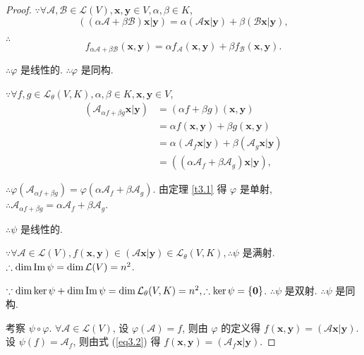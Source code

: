 \documentclass[color=black,device=normal,lang=cn,mode=geye]{elegantnote}
\begin{document}
\begin{proof}
    $\because\forall\mathcal{A},\mathcal{B}\in\mathcal{L}(V),\boldsymbol{x},\boldsymbol{y}\in V,\alpha,\beta\in K$,
    \[((\alpha\mathcal{A}+\beta\mathcal{B})\boldsymbol{x}|\boldsymbol{y})=\alpha(\mathcal{A}\boldsymbol{x}|\boldsymbol{y})+\beta(\mathcal{B}\boldsymbol{x}|\boldsymbol{y}),\]
    
    $\therefore$
    \[f_{\alpha\mathcal{A}+\beta\mathcal{B}}(\boldsymbol{x},\boldsymbol{y})=\alpha f_{\mathcal{A}}(\boldsymbol{x},\boldsymbol{y})+\beta f_{\mathcal{B}}(\boldsymbol{x},\boldsymbol{y}).\]

    $\therefore\varphi$ 是线性的. $\therefore\varphi$ 是同构.

    $\because\forall f,g\in\mathcal{L}_\theta(V,K),\alpha,\beta\in K,\boldsymbol{x},\boldsymbol{y}\in V$,
    \begin{align*}
        (\mathcal{A}_{\alpha f+\beta g}\boldsymbol{x}|\boldsymbol{y}) & =(\alpha f+\beta g)(\boldsymbol{x},\boldsymbol{y}) \\
        & =\alpha f(\boldsymbol{x},\boldsymbol{y})+\beta g(\boldsymbol{x},\boldsymbol{y}) \\
        & =\alpha(\mathcal{A}_f\boldsymbol{x}|\boldsymbol{y})+\beta(\mathcal{A}_g\boldsymbol{x}|\boldsymbol{y}) \\
        & =((\alpha\mathcal{A}_f+\beta\mathcal{A}_g)\boldsymbol{x}|\boldsymbol{y}),
    \end{align*}

    $\therefore\varphi(\mathcal{A}_{\alpha f+\beta g})=\varphi(\alpha\mathcal{A}_f+\beta\mathcal{A}_g)$. 由定理 \ref{t3.1} 得 $\varphi$ 是单射, $\therefore\mathcal{A}_{\alpha f+\beta g}=\alpha\mathcal{A}_f+\beta\mathcal{A}_g$.

    $\therefore\psi$ 是线性的.

    $\because\forall\mathcal{A}\in\mathcal{L}(V),f(\boldsymbol{x},\boldsymbol{y})\in(\mathcal{A}\boldsymbol{x}|\boldsymbol{y})\in\mathcal{L}_\theta(V,K),\therefore\psi$ 是满射. $\therefore\dim\operatorname{Im} \psi=\dim\mathcal{L}(V)=n^2$.

    $\because\dim\ker\psi+\dim\operatorname{Im} \psi=\dim\mathcal{L}_\theta(V,K)=n^2,\therefore\ker\psi=\{\boldsymbol{0}\}$. $\therefore\psi$ 是双射. $\therefore\psi$ 是同构.

    考察 $\psi\circ\varphi$. $\forall\mathcal{A}\in\mathcal{L}(V)$, 设 $\varphi(\mathcal{A})=f$, 则由 $\varphi$ 的定义得 $f(\boldsymbol{x},\boldsymbol{y})=(\mathcal{A}\boldsymbol{x}|\boldsymbol{y})$. 设 $\psi(f)=\mathcal{A}_f$, 则由式 (\ref{eq3.2}) 得 $f(\boldsymbol{x},\boldsymbol{y})=(\mathcal{A}_f\boldsymbol{x}|\boldsymbol{y})$.
    

\end{proof}
\end{document}

